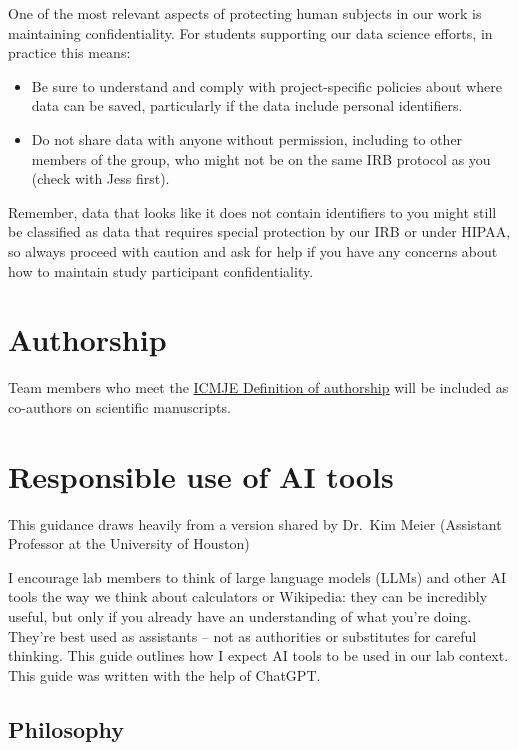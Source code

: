 \documentclass[
]{book}
\providecommand{\tightlist}{%
  \setlength{\itemsep}{0pt}\setlength{\parskip}{0pt}}
\begin{document}
One of the most relevant aspects of protecting human subjects in our work is maintaining confidentiality. For students supporting our data science efforts, in practice this means:

\begin{itemize}
\tightlist
\item
  Be sure to understand and comply with project-specific policies about where data can be saved, particularly if the data include personal identifiers.
\item
  Do not share data with anyone without permission, including to other members of the group, who might not be on the same IRB protocol as you (check with Jess first).
\end{itemize}

Remember, data that looks like it does not contain identifiers to you might still be classified as data that requires special protection by our IRB or under HIPAA, so always proceed with caution and ask for help if you have any concerns about how to maintain study participant confidentiality.

\section{Authorship}\label{authorship}

Team members who meet the \href{http://www.icmje.org/recommendations/browse/roles-and-responsibilities/defining-the-role-of-authors-and-contributors.html}{ICMJE Definition of authorship} will be included as co-authors on scientific manuscripts.

\section{Responsible use of AI tools}\label{responsible-use-of-ai-tools}

This guidance draws heavily from a version shared by Dr.~Kim Meier (Assistant Professor at the University of Houston)

I encourage lab members to think of large language models (LLMs) and other AI tools the way we think about calculators or Wikipedia: they can be incredibly useful, but only if you already have an understanding of what you're doing. They're best used as assistants -- not as authorities or substitutes for careful thinking. This guide outlines how I expect AI tools to be used in our lab context. This guide was written with the help of ChatGPT.

\subsection{Philosophy}\label{philosophy}
\end{document}
